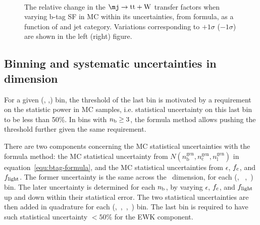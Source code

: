 \begin{figure}[!h]
  \centering
   ~~
  \\

  \caption{\label{fig:tfSyst_bsf_muToTtw-formula} The relative change in the $\mj \rightarrow \mathrm{tt+W}$ transfer
  factors when varying b-tag SF in MC within its uncertainties, from formula, 
  as a function of \scalht and jet category.
  Variations corresponding to $+1\sigma$ ($-1\sigma$) are shown in the left (right) figure. 
  }
\end{figure}


\subsection{Binning and systematic uncertainties in \mht dimension}
For a given (\njet, \nb,\scalht) bin, the threshold of the last \mht bin is 
motivated by a requirement on the statistic power in MC samples, i.e. statistical
uncertainty on this last bin to be less than 50\%. In bins with $n_{\rm b} \geq
3$, the formula method allows pushing the \mht threshold further given the
same requirement.

There are two components concerning the MC statistical uncertainties with 
the formula method: the MC statistical uncertainty from $N(n_{\textrm{b}}^{\textrm{gen}},
n_{\textrm{c}}^{\textrm{gen}}, n_{\textrm{l}}^{\textrm{gen}})$ in equation~\ref{equ:btag-formula}, and the 
MC statistical uncertainties from $\epsilon$, $f_{\rm c}$, and $f_{\rm light}$.
The former uncertainty is the same across the \nb~dimension, for each (\njet,
~\scalht,~\mht) bin. The later uncertainty is determined for each $n_{\rm b}$, by 
varying $\epsilon$, $f_{\rm c}$, and $f_{\rm light}$ up and down within their 
statistical error. The two statistical uncertainties are then added in quadrature for each 
(\njet,~\nb,~\scalht,~\mht) bin. The last \mht bin is required to have such
 statistical uncertainty $< 50\%$ for the EWK component.

